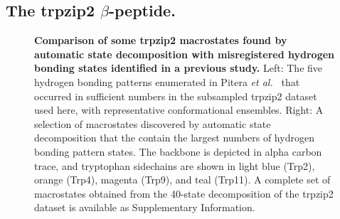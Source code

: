 \subsection{The trpzip2 $\beta$-peptide.}
\label{applications:hairpin}

\begin{figure}[tb]
  \begin{center}
  \end{center}
  \caption{{\bf Comparison of some trpzip2 macrostates found by automatic state decomposition with misregistered hydrogen bonding states identified in a previous study.}  
  Left: The five hydrogen bonding patterns enumerated in Pitera \emph{et al.\ } \cite{pitera:2006a} that occurred in sufficient numbers in the subsampled trpzip2 dataset used here, with representative conformational ensembles.  
  Right: A selection of macrostates discovered by automatic state decomposition that the contain the largest numbers of hydrogen bonding pattern states.  
  The backbone is depicted in alpha carbon trace, and tryptophan sidechains are shown in light blue (Trp2), orange (Trp4), magenta (Trp9), and teal (Trp11).
  A complete set of macrostates obtained from the 40-state decomposition of the trpzip2 dataset is available as Supplementary Information.
  }
  \label{figure:trpzip2-states}
\end{figure}

